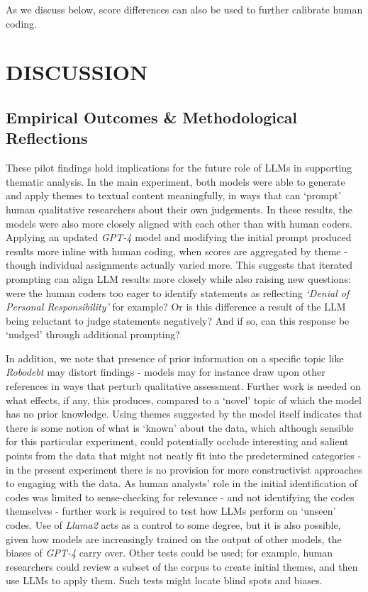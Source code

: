 \documentclass{article}
\begin{document}
As we discuss below, score differences can also be used to further calibrate human coding. 


\section{DISCUSSION}\label{discussion}

\subsection{\texorpdfstring{Empirical Outcomes \& Methodological Reflections }{Empirical Outcomes \& Methodological Reflections }}\label{empirical-outcomes-methodological-reflections}

These pilot findings hold implications for the future role of LLMs in supporting thematic analysis. In the main experiment, both models were able to generate and apply themes to textual content meaningfully, in ways that can `prompt' human qualitative researchers about their own judgements. In these results, the models were also more closely aligned with each other than with human coders. Applying an updated \emph{GPT-4} model and modifying the initial prompt produced results more inline with human coding, when scores are aggregated by theme - though individual assignments actually varied more. This suggests that iterated prompting can align LLM results more closely while also raising new questions: were the human coders too eager to identify statements as reflecting \emph{`Denial of Personal Responsibility'} for example? Or is this difference a result of the LLM being reluctant to judge statements negatively? And if so, can this response be `nudged' through additional prompting? 

In addition, we note that presence of prior information on a specific topic like \emph{Robodebt} may distort findings - models may for instance draw upon other references in ways that perturb qualitative assessment. Further work is needed on what effects, if any, this produces, compared to a `novel' topic of which the model has no prior knowledge. Using themes suggested by the model itself indicates that there is some notion of what is `known' about the data, which although sensible for this particular experiment, could potentially occlude interesting and salient points from the data that might not neatly fit into the predetermined categories - in the present experiment there is no provision for more constructivist approaches to engaging with the data. As human analysts' role in the initial identification of codes was limited to sense-checking for relevance - and not identifying the codes themselves - further work is required to test how LLMs perform on `unseen' codes. Use of \emph{Llama2} acts as a control to some degree, but it is also possible, given how models are increasingly trained on the output of other models, the biases of \emph{GPT-4} carry over. Other tests could be used; for example, human researchers could review a subset of the corpus to create initial themes, and then use LLMs to apply them. Such tests might locate blind spots and biases. 
\end{document}
